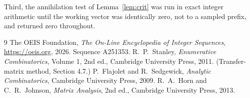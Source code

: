 \documentclass[11pt,a4paper]{article}
\theoremstyle{plain}
\theoremstyle{definition}
\begin{document}
Third, the annihilation test of Lemma~\ref{lem:crit} was run in exact integer arithmetic
until the working vector was identically zero, not to a sampled prefix, and returned zero
throughout.

\begin{thebibliography}{9}
 The OEIS Foundation, \emph{The On-Line Encyclopedia of Integer
Sequences}, \url{https://oeis.org}, 2026. Sequence A251353.
 R.~P.~Stanley, \emph{Enumerative Combinatorics}, Volume 1, 2nd ed.,
Cambridge University Press, 2011. (Transfer-matrix method, Section 4.7.)
 P.~Flajolet and R.~Sedgewick, \emph{Analytic Combinatorics}, Cambridge
University Press, 2009.
 R.~A.~Horn and C.~R.~Johnson, \emph{Matrix Analysis}, 2nd ed., Cambridge
University Press, 2013.
\end{thebibliography}
\end{document}
